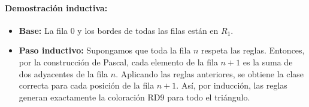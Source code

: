 \documentclass[12pt]{article}
\begin{document}
\paragraph{Demostración inductiva:}
\begin{itemize}
    \item \textbf{Base:} La fila $0$ y los bordes de todas las filas están en $R_1$.
    \item \textbf{Paso inductivo:} Supongamos que toda la fila $n$ respeta las reglas.  
    Entonces, por la construcción de Pascal, cada elemento de la fila $n+1$ es la suma de dos adyacentes de la fila $n$.  
    Aplicando las reglas anteriores, se obtiene la clase correcta para cada posición de la fila $n+1$.  
    Así, por inducción, las reglas generan exactamente la coloración RD9 para todo el triángulo.
\end{itemize}
\end{document}
